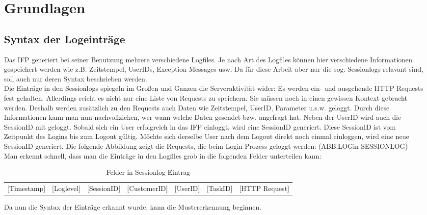 \section{Grundlagen}\raggedbottom

\subsection{Syntax der Logeinträge}
\label{sub:Aufbau der Logeinträge}
Das IFP generiert bei seiner Benutzung mehrere verschiedene Logfiles. Je nach Art des Logfiles können hier verschiedene Informationen gespeichert werden wie z.B. Zeitstempel, UserIDs, Exception Messages usw. Da für diese Arbeit aber nur die sog. \glqq Sessionlogs\grqq{} relavant sind, soll auch nur deren Syntax beschrieben werden.\\
Die Einträge in den Sessionlogs spiegeln im Großen und Ganzen die Serveraktivität wider: Es werden ein- und ausgehende HTTP Requests fest gehalten. Allerdings reicht es nicht nur eine Liste von Requests zu speichern. Sie müssen noch in einen gewissen Kontext gebracht werden. Deshalb werden zusätzlich zu den Requests auch Daten wie Zeitstempel, UserID, Parameter u.s.w. geloggt. Durch diese Informationen kann man nun nachvollziehen, wer wann welche Daten gesendet bzw. angefragt hat. Neben der UserID wird auch die SessionID mit geloggt. Sobald sich ein User erfolgreich in das IFP einloggt, wird eine SessionID generiert. Diese SessionID ist vom Zeitpunkt des Logins bis zum Logout gültig. Möchte sich derselbe User nach dem Logout direkt noch einmal einloggen, wird eine neue SessionID generiert. Die folgende Abbildung zeigt die Requests, die beim Login Prozess geloggt werden: (ABB:LOGin-SESSIONLOG)
\\
Man erkennt schnell, dass man die Einträge in den Logfiles grob in die folgenden Felder unterteilen kann:\\
\begin{table}[htb]
	\begin{center}
		\begin{tabular}{lllllll}
			[Timestamp]&[Loglevel]&[SessionID]&[CustomerID]&[UserID]&[TaskID]&[HTTP Request]
		\end{tabular}
		\caption{Felder in Sessionlog Eintrag}
		\label{tab_session_fields}
	\end{center}
\end{table}

Da nun die Syntax der Einträge erkannt wurde, kann die Mustererkennung beginnen.


